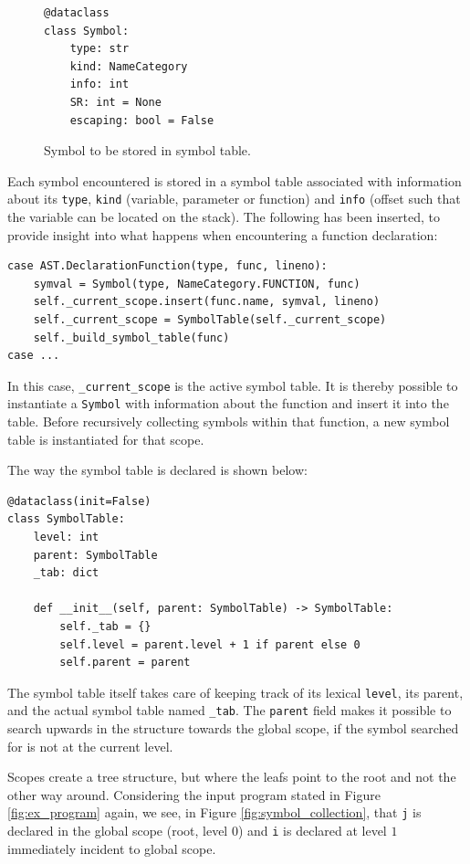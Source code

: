 \begin{figure}[H]
\begin{verbatim}
@dataclass
class Symbol:
    type: str
    kind: NameCategory
    info: int
    SR: int = None
    escaping: bool = False
\end{verbatim}
    \caption{Symbol to be stored in symbol table.}
    \label{fig:symbol}
\end{figure}

Each symbol encountered is stored in a symbol table associated with information about its \texttt{type}, \texttt{kind} (variable, parameter or function) and \texttt{info} (offset such that the variable can be located on the stack). The following has been inserted, to provide insight into what happens when encountering a function declaration:

\begin{verbatim}
case AST.DeclarationFunction(type, func, lineno):
    symval = Symbol(type, NameCategory.FUNCTION, func)
    self._current_scope.insert(func.name, symval, lineno)
    self._current_scope = SymbolTable(self._current_scope)
    self._build_symbol_table(func)
case ...
\end{verbatim}

In this case, \texttt{\_current\_scope} is the active symbol table. It is thereby possible to instantiate a \texttt{Symbol} with information about the function and insert it into the table. Before recursively collecting symbols within that function, a new symbol table is instantiated for that scope.

The way the symbol table is declared is shown below:

\begin{verbatim}
@dataclass(init=False)
class SymbolTable:
    level: int
    parent: SymbolTable
    _tab: dict

    def __init__(self, parent: SymbolTable) -> SymbolTable:
        self._tab = {}
        self.level = parent.level + 1 if parent else 0
        self.parent = parent
\end{verbatim}

The symbol table itself takes care of keeping track of its lexical \texttt{level}, its parent, and the actual symbol table named \texttt{\_tab}. The \texttt{parent} field makes it possible to search upwards in the structure towards the global scope, if the symbol searched for is not at the current level.

Scopes create a tree structure, but where the leafs point to the root and not the other way around. Considering the input program stated in Figure \ref{fig:ex_program} again, we see, in Figure \ref{fig:symbol_collection}, that \texttt{j} is declared in the global scope (root, level $0$) and \texttt{i} is declared at level $1$ immediately incident to global scope. 

